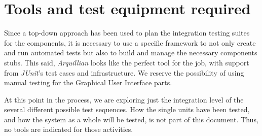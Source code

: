 \chapter{Tools and test equipment required}
Since a top-down approach has been used to plan the integration testing suites for the components, it is necessary to use a specific framework to not only create and run automated tests but also to build and manage the necessary components stubs. This said, \emph{Arquillian} looks like the perfect tool for the job, with support from \emph{JUnit}'s test cases and infrastructure. We reserve the possibility of using manual testing for the Graphical User Interface parts.

At this point in the process, we are exploring just the integration level of the several different possible test sequences. How the single units have been tested, and how the system as a whole will be tested, is not part of this document. Thus, no tools are indicated for those activities.
